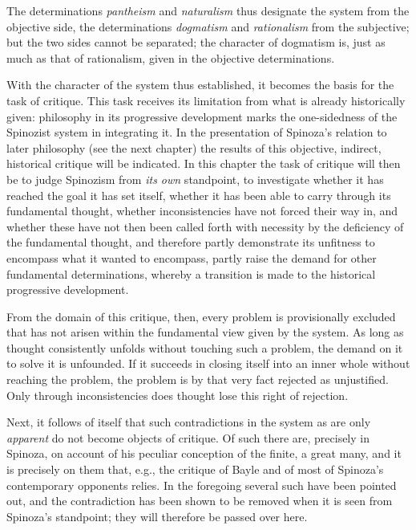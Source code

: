 \documentclass[12pt,a4paper,openany]{book}
\newcommand{\opage}[1]{\marginnote{\footnotesize\textit{[#1]}}}
\begin{document}
\opage{174} The determinations \emph{pantheism} and \emph{naturalism} thus designate
the system from the objective side, the determinations
\emph{dogmatism} and \emph{rationalism} from the subjective; but
the two sides cannot be separated; the character of dogmatism
is, just as much as that of rationalism, given in the objective determinations.

With the character of the system thus established, it becomes
the basis for the task of critique. This task receives its limitation
from what is already historically given: philosophy
in its progressive development marks the one-sidedness of
the Spinozist system in integrating it. In
the presentation of Spinoza's relation to later philosophy
(see the next chapter) the results of this objective,
indirect, historical critique will be indicated. In this
chapter the task of critique will then be to judge Spinozism
from \emph{its own} standpoint, to investigate whether
it has reached the goal it has set itself, whether
it has been able to carry through its fundamental thought, whether inconsistencies
have not forced their way in, and whether these have not then been called forth with
necessity by the deficiency of the fundamental thought,
and therefore partly demonstrate its unfitness to
encompass what it wanted to encompass, partly raise the demand
for other fundamental determinations, whereby a transition is made to
the historical progressive development.

From the domain of this critique, then, every problem
is provisionally excluded that has not arisen within the fundamental view
given by the system. As long as thought consistently
unfolds without touching such a problem, the demand
on it to solve it is unfounded. If it succeeds
in closing itself into an inner whole without reaching
the problem, the problem is by that very fact rejected as unjustified.
Only through inconsistencies does thought lose this right of rejection.

Next, it follows of itself that such contradictions
in the system as are only \emph{apparent} do not become
objects of critique. Of such there are, precisely in
Spinoza, on account of his peculiar conception of
\opage{175}\setcounter{footnote}{0}the finite, a great many, and it is precisely on them that,
e.g., the critique of Bayle and of most of Spinoza's contemporary opponents
relies. In the foregoing several such
have been pointed out, and the contradiction has been shown to be removed when
it is seen from Spinoza's standpoint; they will therefore be
passed over here.
\end{document}
